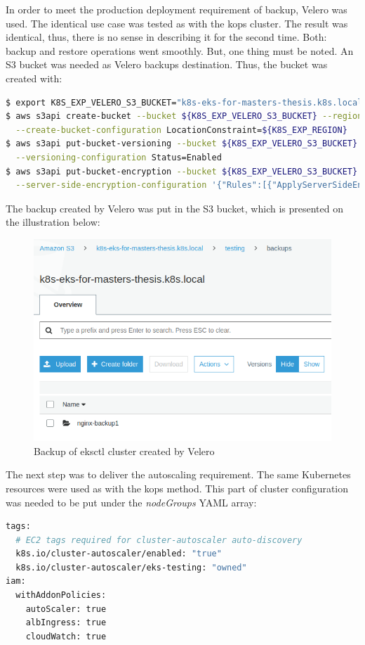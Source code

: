 In order to meet the production deployment requirement of backup, Velero was used. The identical use case was tested as with the kops cluster. The result was identical, thus, there is no sense in describing it for the second time. Both: backup and restore operations went smoothly. But, one thing must be noted. An S3 bucket was needed as Velero backups destination. Thus, the bucket was created with:
\begin{lstlisting}[basicstyle=\tiny,caption={Creating an S3 bucket for Velero},captionpos=b,language=Bash,xleftmargin=1cm]
$ export K8S_EXP_VELERO_S3_BUCKET="k8s-eks-for-masters-thesis.k8s.local"
$ aws s3api create-bucket --bucket ${K8S_EXP_VELERO_S3_BUCKET} --region ${K8S_EXP_REGION} \
  --create-bucket-configuration LocationConstraint=${K8S_EXP_REGION}
$ aws s3api put-bucket-versioning --bucket ${K8S_EXP_VELERO_S3_BUCKET} \
  --versioning-configuration Status=Enabled
$ aws s3api put-bucket-encryption --bucket ${K8S_EXP_VELERO_S3_BUCKET} \
  --server-side-encryption-configuration '{"Rules":[{"ApplyServerSideEncryptionByDefault":{"SSEAlgorithm":"AES256"}}]}'
\end{lstlisting}
The backup created by Velero was put in the S3 bucket, which is presented on the illustration below:
\begin{figure}[H]
    \centering
    \includegraphics[width=14cm]{figures/eks-backup.png}
    \captionsetup{justification=centering,margin=2cm}
    \caption{Backup of eksctl cluster created by Velero}
\end{figure}

The next step was to deliver the autoscaling requirement. The same Kubernetes resources were used as with the kops method. This part of cluster configuration was needed to be put under the \textit{nodeGroups} YAML array:
\begin{lstlisting}[basicstyle=\tiny,caption={Eksctl configuration needed for autoscaler},captionpos=b,language=Bash,xleftmargin=1cm]
tags:
  # EC2 tags required for cluster-autoscaler auto-discovery
  k8s.io/cluster-autoscaler/enabled: "true"
  k8s.io/cluster-autoscaler/eks-testing: "owned"
iam:
  withAddonPolicies:
    autoScaler: true
    albIngress: true
    cloudWatch: true
\end{lstlisting}

